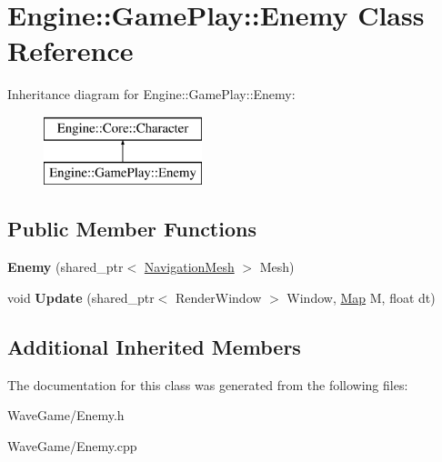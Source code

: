 \hypertarget{class_engine_1_1_game_play_1_1_enemy}{}\section{Engine\+:\+:Game\+Play\+:\+:Enemy Class Reference}
\label{class_engine_1_1_game_play_1_1_enemy}
Inheritance diagram for Engine\+:\+:Game\+Play\+:\+:Enemy\+:\begin{figure}[H]
\begin{center}
\leavevmode
\includegraphics[height=2.000000cm]{class_engine_1_1_game_play_1_1_enemy}
\end{center}
\end{figure}
\subsection*{Public Member Functions}
\begin{DoxyCompactItemize}
\item 
\mbox{\label{class_engine_1_1_game_play_1_1_enemy_a3bc6af2bf8271749ac156b6f8893e1b6}} 
{\bfseries Enemy} (shared\+\_\+ptr$<$ \hyperlink{class_engine_1_1_core_1_1_navigation_mesh}{Navigation\+Mesh} $>$ Mesh)
\item 
\mbox{\label{class_engine_1_1_game_play_1_1_enemy_a19fde24e4ac05f3299232827552c46f1}} 
void {\bfseries Update} (shared\+\_\+ptr$<$ Render\+Window $>$ Window, \hyperlink{class_engine_1_1_core_1_1_map}{Map} M, float dt)
\end{DoxyCompactItemize}
\subsection*{Additional Inherited Members}


The documentation for this class was generated from the following files\+:\begin{DoxyCompactItemize}
\item 
Wave\+Game/Enemy.\+h\item 
Wave\+Game/Enemy.\+cpp\end{DoxyCompactItemize}
